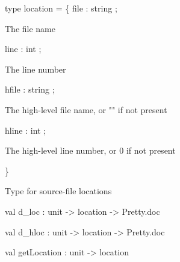 \documentclass[11pt]{article}
\begin{document}
\label{type:Errormsg.location}\begin{ocamldoccode}
type location = \{
  file : string ;
\end{ocamldoccode}
\begin{ocamldoccomment}
The file name
\end{ocamldoccomment}
\begin{ocamldoccode}
  line : int ;
\end{ocamldoccode}
\begin{ocamldoccomment}
The line number
\end{ocamldoccomment}
\begin{ocamldoccode}
  hfile : string ;
\end{ocamldoccode}
\begin{ocamldoccomment}
The high-level file name, or "" if not present
\end{ocamldoccomment}
\begin{ocamldoccode}
  hline : int ;
\end{ocamldoccode}
\begin{ocamldoccomment}
The high-level line number, or 0 if not present
\end{ocamldoccomment}
\begin{ocamldoccode}
\}
\end{ocamldoccode}
\begin{ocamldocdescription}
Type for source-file locations


\end{ocamldocdescription}




\label{val:Errormsg.d-underscoreloc}\begin{ocamldoccode}
val d_loc : unit -> location -> Pretty.doc
\end{ocamldoccode}




\label{val:Errormsg.d-underscorehloc}\begin{ocamldoccode}
val d_hloc : unit -> location -> Pretty.doc
\end{ocamldoccode}




\label{val:Errormsg.getLocation}\begin{ocamldoccode}
val getLocation : unit -> location
\end{ocamldoccode}
\end{document}
